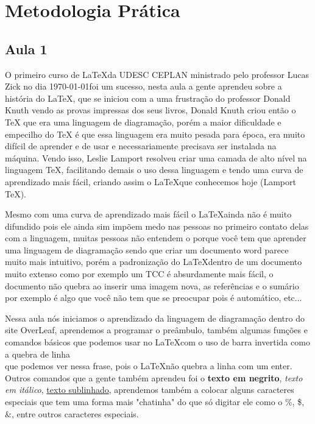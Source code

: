 \chapter{Metodologia Prática}

\section{Aula 1}
O primeiro curso de \LaTeX  da UDESC CEPLAN ministrado pelo professor Lucas Zick no dia \today foi um sucesso, nesta aula a gente aprendeu sobre a história do \LaTeX, que se iniciou com a uma frustração do professor Donald Knuth vendo as provas impressas dos seus livros, Donald Knuth criou então o TeX que era uma linguagem de diagramação, porém a maior dificuldade e empecilho do TeX é que essa linguagem era muito pesada para época, era muito difícil de aprender e de usar e necessariamente precisava ser instalada na máquina. Vendo isso, Leslie Lamport resolveu criar uma camada de alto nível na linguagem TeX, facilitando demais o uso dessa linguagem e tendo uma curva de aprendizado mais fácil, criando assim o \LaTeX que conhecemos hoje (Lamport TeX).

Mesmo com uma curva de aprendizado mais fácil o \LaTeX ainda não é muito difundido pois ele ainda sim impõem medo nas pessoas no primeiro contato delas com a linguagem, muitas pessoas não entendem o porque você tem que aprender uma linguagem de diagramação sendo que criar um documento word parece muito mais intuitivo, porém a padronização do \LaTeX dentro de um documento muito extenso como por exemplo um TCC é absurdamente mais fácil, o documento não quebra ao inserir uma imagem nova, as referências e o sumário por exemplo é algo que você não tem que se preocupar pois é automático, etc...

Nessa aula nós iniciamos o aprendizado da linguagem de diagramação dentro do site OverLeaf, aprendemos a programar o preâmbulo, também algumas funções e comandos básicos que podemos usar no \LaTeX com o uso de barra invertida como a quebra de linha\\que podemos ver nessa frase, pois o \LaTeX não quebra a linha com um enter. Outros comandos que a gente também aprendeu foi o \textbf{texto em negrito}, \textit{texto em itálico}, \underline{texto sublinhado}, aprendemos também a colocar alguns caracteres especiais que tem uma forma mais "chatinha" do que só digitar ele como o \%, \$, \&, entre outros caracteres especiais.


